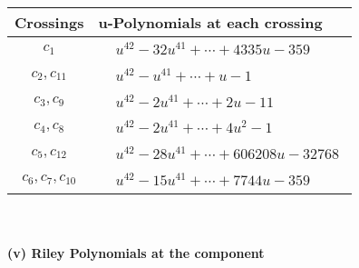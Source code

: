 \documentclass[1p]{elsarticle_modified}
\theoremstyle{definition}
\begin{document}
\begin{tabular}{m{50pt}|m{274pt}}
Crossings & \hspace{64pt}u-Polynomials at each crossing \\
\hline $$\begin{aligned}c_{1}\end{aligned}$$&$\begin{aligned}
&u^{42}-32 u^{41}+\cdots+4335 u-359
\end{aligned}$\\
\hline $$\begin{aligned}c_{2},c_{11}\end{aligned}$$&$\begin{aligned}
&u^{42}- u^{41}+\cdots+u-1
\end{aligned}$\\
\hline $$\begin{aligned}c_{3},c_{9}\end{aligned}$$&$\begin{aligned}
&u^{42}-2 u^{41}+\cdots+2 u-11
\end{aligned}$\\
\hline $$\begin{aligned}c_{4},c_{8}\end{aligned}$$&$\begin{aligned}
&u^{42}-2 u^{41}+\cdots+4 u^2-1
\end{aligned}$\\
\hline $$\begin{aligned}c_{5},c_{12}\end{aligned}$$&$\begin{aligned}
&u^{42}-28 u^{41}+\cdots+606208 u-32768
\end{aligned}$\\
\hline $$\begin{aligned}c_{6},c_{7},c_{10}\end{aligned}$$&$\begin{aligned}
&u^{42}-15 u^{41}+\cdots+7744 u-359
\end{aligned}$\\
\hline
\end{tabular}\\~\\
\newpage\renewcommand{\arraystretch}{1}
\flushleft \textbf{(v) Riley Polynomials at the component}\newline \\
\end{document}
